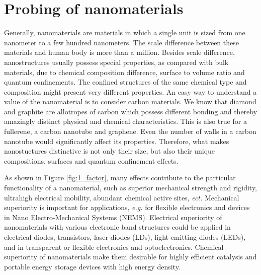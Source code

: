\section{Probing of nanomaterials}
Generally, nanomaterials are materials in which a single unit is sized from one nanometer to a few hundred nanometers. The scale difference between these materials and human body is more than a million. Besides scale difference, nanostructures usually possess special properties, as compared with bulk materials, due to chemical composition difference, surface to volume ratio and quantum confinements. The confined structures of the same chemical type and composition might present very different properties. An easy way to understand a value of the nanomaterial is to consider carbon materials. We know that diamond and graphite are allotropes of carbon which possess different bonding and thereby amazingly distinct physical and chemical characteristics. This is also true for a fullerene, a carbon nanotube and graphene. Even the number of walls in a carbon nanotube would significantly affect its properties. \cite{rodunerwhynano2006} Therefore, what makes nanostuctures distinctive is not only their size, but also their unique compositions, surfaces and quantum confinement effects. 

\renewcommand{\thefootnote}{\fnsymbol{footnote}}

As shown in Figure \ref{fig:1_factor}, many effects contribute to the particular functionality of a nanomaterial, such as superior mechanical strength and rigidity, ultrahigh electrical mobility, abundant chemical active sites, \textit{ect.} Mechanical superiority is important for applications, \textit{e.g.} for flexible electronics and devices in Nano Electro-Mechanical Systems (NEMS). Electrical superiority of nanomaterials with various electronic band structures could be applied in electrical diodes, transistors, laser diodes (LDs), light-emitting diodes (LEDs), and in transparent or flexible electronics and optoelectronics. Chemical superiority of nanomaterials make them desirable for highly efficient catalysis and portable energy storage devices with high energy density. 

